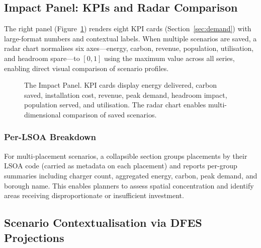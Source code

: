 \subsection{Impact Panel: KPIs and Radar Comparison}
\label{sec:impact-panel}

The right panel (Figure~\ref{fig:impact-panel}) renders eight KPI cards (Section~\ref{sec:demand}) with large-format numbers and contextual labels. When multiple scenarios are saved, a radar chart normalises six axes---energy, carbon, revenue, population, utilisation, and headroom spare---to $[0, 1]$ using the maximum value across all series, enabling direct visual comparison of scenario profiles.

\begin{figure}[htbp]
    \centering
    \caption{The Impact Panel. KPI cards display energy delivered, carbon saved, installation cost, revenue, peak demand, headroom impact, population served, and utilisation. The radar chart enables multi-dimensional comparison of saved scenarios.}
    \label{fig:impact-panel}
\end{figure}

\subsubsection{Per-LSOA Breakdown}

For multi-placement scenarios, a collapsible section groups placements by their LSOA code (carried as metadata on each placement) and reports per-group summaries including charger count, aggregated energy, carbon, peak demand, and borough name. This enables planners to assess spatial concentration and identify areas receiving disproportionate or insufficient investment.

\subsection{Scenario Contextualisation via DFES Projections}
\label{sec:dfes}

